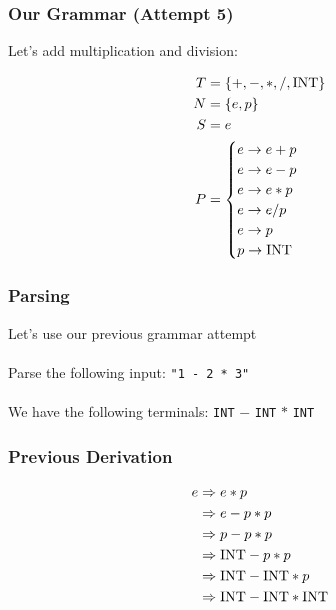 \documentclass[aspectratio=169]{beamer}
\begin{document}
\begin{frame}
\frametitle{Our Grammar (Attempt 5)}

Let's add multiplication and division:

\begin{align*}
T &= \{ +, -, *, /, \text{\lstinline{INT}} \}\\
N &= \{ e, p \}\\
S &= e\\
P &= \begin{cases}e \rightarrow e + p \\
     e \rightarrow e - p\\
     e \rightarrow e * p\\
     e \rightarrow e / p\\
     e \rightarrow p\\
     p \rightarrow \text{\lstinline{INT}}\end{cases}
\end{align*}
\end{frame}

\begin{frame}
\frametitle{Parsing}

Let's use our previous grammar attempt\\~\\

Parse the following input: \lstinline{"1 - 2 * 3"}\\~\\

We have the following terminals: \lstinline{INT} $-$ \lstinline{INT} $*$
\lstinline{INT}
\end{frame}

\begin{frame}
\frametitle{Previous Derivation}

\begin{align*}
e &\Rightarrow e * p\\
  &\Rightarrow e - p * p\\
  &\Rightarrow p - p * p\\
  &\Rightarrow \text{\lstinline{INT}} - p * p\\
  &\Rightarrow \text{\lstinline{INT}} - \text{\lstinline{INT}} * p\\
  &\Rightarrow \text{\lstinline{INT}} - \text{\lstinline{INT}} *
               \text{\lstinline{INT}}
\end{align*}
\end{frame}
\end{document}

